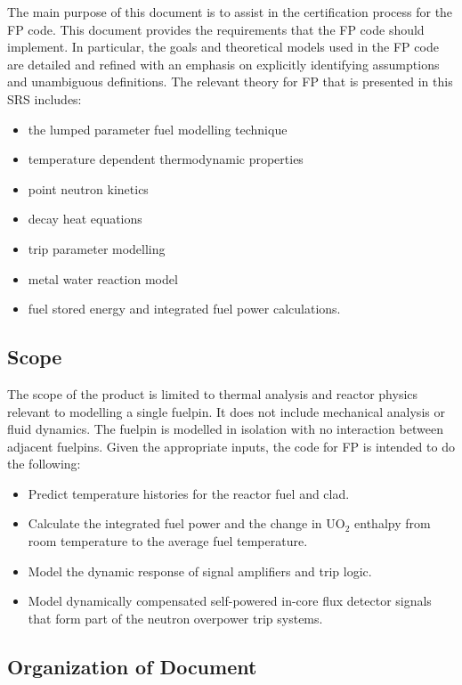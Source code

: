 The main purpose of this document is to assist in the certification process for
the FP code. This document provides the requirements that the FP code should
implement. In particular, the goals and theoretical models used in the FP code
are detailed and refined with an emphasis on explicitly identifying assumptions
and unambiguous definitions. The relevant theory for FP that is presented in
this SRS includes:

\begin{itemize}
\item the lumped parameter fuel modelling technique
\item temperature dependent thermodynamic properties
\item point neutron kinetics
\item decay heat equations
\item trip parameter modelling
\item metal water reaction model
\item fuel stored energy and integrated fuel power calculations.
\end{itemize}

\subsection{Scope} 

The scope of the product is limited to thermal analysis and reactor physics
relevant to modelling a single fuelpin. It does not include mechanical analysis
or fluid dynamics. The fuelpin is modelled in isolation with no interaction
between adjacent fuelpins. Given the appropriate inputs, the code for FP is
intended to do the following:

\begin{itemize}

\item Predict temperature histories for the reactor fuel and clad.
\item Calculate the integrated fuel power and the change in $\mathrm{UO_2}$
  enthalpy from room temperature to the average fuel temperature.
\item Model the dynamic response of signal amplifiers and trip logic.
\item Model dynamically compensated self-powered in-core flux detector signals
  that form part of the neutron overpower trip systems.
\end{itemize}

\subsection{Organization of Document}

